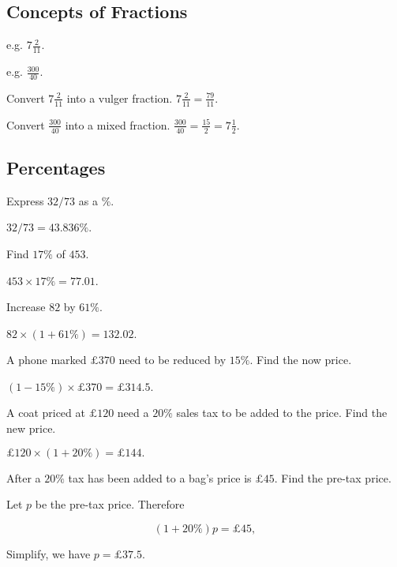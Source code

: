 \documentclass[8pt]{article}
\begin{document}
		\subsection{Concepts of Fractions}

			\defi {} e.g. \(7 \frac{2}{11}\).

			\defi {} e.g. \(\frac{300}{40}\).

			\exmp {} Convert \(7 \frac{2}{11}\) into a vulger fraction. \(7 \frac{2}{11} = \frac{79}{11}\).

			\exmp {} Convert \(\frac{300}{40}\) into a mixed fraction. \(\frac{300}{40} = \frac{15}{2} = 7 \frac{1}{2}\).

		\subsection{Percentages}

			\prob Express \(32/73\) as a \(\%\).
			
			\solution \(32/73 = 43.836\%\).\newline

			\prob Find \(17\%\) of \(453\).
			
			\solution\(453 \times 17\% = 77.01\).\newline

			\prob Increase \(82\) by \(61\%\).
			
			\solution \(82 \times (1+61\%) = 132.02\).\newline

			\prob A phone marked \(\pounds 370\) need to be reduced by \(15\%\). Find the now price.
			
			\solution \((1-15\%) \times \pounds 370 = \pounds 314.5\).\newline

			\prob A coat priced at \(\pounds 120\) need a \(20\%\) sales tax to be added to the price. Find the new price.
			
			\solution \(\pounds 120 \times (1+20\%) = \pounds 144.\)\newline

			\prob After a \(20\%\) tax has been added to a bag's price is \(\pounds 45\). Find the pre-tax price.
			
			\solution Let \(p\) be the pre-tax price. Therefore
			
			\[(1+20\%)p = \pounds 45,\]
			
			Simplify, we have \(p = \pounds 37.5\).\newline
\end{document}
